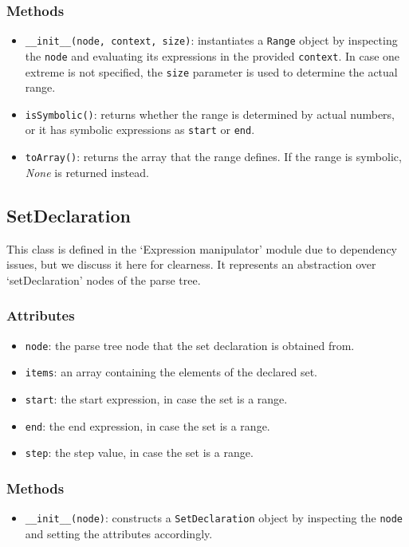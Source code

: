 \documentclass[12pt,a4paper]{report}
\theoremstyle{definition}
\theoremstyle{definition}
\theoremstyle{definition}
\begin{document}
\subsubsection{Methods}
\begin{itemize}
    \itemsep 0em
    \item \texttt{\_\_init\_\_(node, context, size)}: instantiates a \texttt{Range} object by inspecting the \texttt{node} and evaluating its expressions in the provided \texttt{context}. In case one extreme is not specified, the \texttt{size} parameter is used to determine the actual range.
    \item \texttt{isSymbolic()}: returns whether the range is determined by actual numbers, or it has symbolic expressions as \texttt{start} or \texttt{end}.
    \item \texttt{toArray()}: returns the array that the range defines. If the range is symbolic, \textit{None} is returned instead.
\end{itemize}


\subsection{SetDeclaration}
This class is defined in the `Expression manipulator' module due to dependency issues, but we discuss it here for clearness. It represents an abstraction over `setDeclaration' nodes of the parse tree.
\subsubsection{Attributes}
\begin{itemize}
    \itemsep 0em
    \item \texttt{node}: the parse tree node that the set declaration is obtained from.
    \item \texttt{items}: an array containing the elements of the declared set.
    \item \texttt{start}: the start expression, in case the set is a range.
    \item \texttt{end}: the end expression, in case the set is a range.
    \item \texttt{step}: the step value, in case the set is a range.
\end{itemize}
\subsubsection{Methods}
\begin{itemize}
    \itemsep 0em
    \item \texttt{\_\_init\_\_(node)}: constructs a \texttt{SetDeclaration} object by inspecting the \texttt{node} and setting the attributes accordingly.
\end{itemize}
\end{document}
